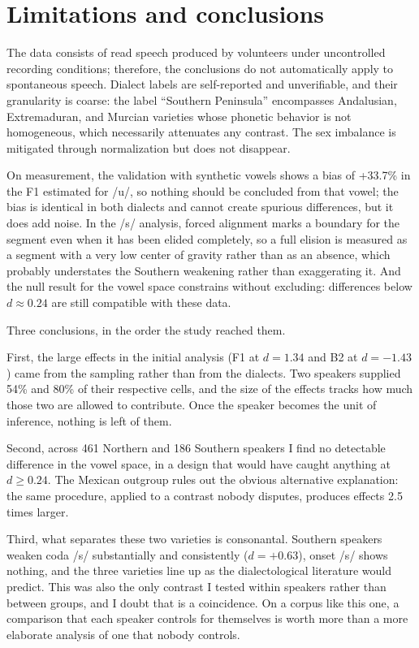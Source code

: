 \documentclass[11pt]{article}
\begin{document}
\section{Limitations and conclusions}
\label{sec:limitations}

The data consists of read speech produced by volunteers under uncontrolled
recording conditions; therefore, the conclusions do not automatically apply to
spontaneous speech. Dialect labels are self-reported and unverifiable, and their
granularity is coarse: the label ``Southern Peninsula'' encompasses Andalusian,
Extremaduran, and Murcian varieties whose phonetic behavior is not homogeneous,
which necessarily attenuates any contrast. The sex imbalance is mitigated through
normalization but does not disappear.

On measurement, the validation with synthetic vowels shows a bias of +33.7\% in
the F1 estimated for /u/, so nothing should be concluded from that vowel; the
bias is identical in both dialects and cannot create spurious differences, but it
does add noise. In the /s/ analysis, forced alignment marks a boundary for the
segment even when it has been elided completely, so a full elision is measured as
a segment with a very low center of gravity rather than as an absence, which
probably understates the Southern weakening rather than exaggerating it. And the
null result for the vowel space constrains without excluding: differences below
$d \approx 0.24$ are still compatible with these data.

Three conclusions, in the order the study reached them.

First, the large effects in the initial analysis (F1 at $d = 1.34$ and B2 at
$d = -1.43$) came from the sampling rather than from the dialects. Two
speakers supplied 54\% and 80\% of their respective cells, and the size of the
effects tracks how much those two are allowed to contribute. Once the speaker
becomes the unit of inference, nothing is left of them.

Second, across 461 Northern and 186 Southern speakers I find no detectable
difference in the vowel space, in a design that would have caught anything at
$d \geq 0.24$. The Mexican outgroup rules out the obvious alternative
explanation: the same procedure, applied to a contrast nobody disputes, produces
effects 2.5 times larger.

Third, what separates these two varieties is consonantal. Southern speakers
weaken coda /s/ substantially and consistently ($d = +0.63$), onset /s/ shows
nothing, and the three varieties line up as the dialectological literature would
predict. This was also the only contrast I tested within speakers rather than
between groups, and I doubt that is a coincidence. On a corpus like this one, a
comparison that each speaker controls for themselves is worth more than a more
elaborate analysis of one that nobody controls.
\end{document}
